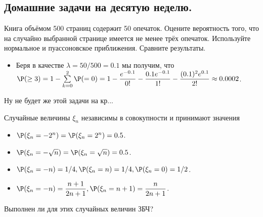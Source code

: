 \subsection{Домашние задачи на десятую неделю.}
\begin{problem}
    Книга объёмом 500 страниц содержит 50 опечаток.
    Оцените вероятность того, что на случайно выбранной странице имеется не менее трёх опечаток.
    Используйте нормальное и пуассоновское приближения.
    Сравните результаты.
\end{problem}
\begin{solution} \leavevmode
    \begin{itemize}
        \item Беря в качестве $\lambda = 50/500 = 0.1$ мы получим, что $\P(\geq 3) = 1 - \sum\limits_{k = 0}^{2} \P( = 0) = 1 - \dfrac{e^{-0.1}}{0!} - \dfrac{0.1e^{-0.1}}{1!} - \dfrac{(0.1)^2 e^{0.1}}{2!} \approx 0.0002$.
    \end{itemize}
    Ну не будет же этой задачи на кр...
\end{solution}
\begin{problem}
    Случайные величины $\xi_n$ независимы в совокупности и принимают значения
    \begin{itemize}
        \item $\P(\xi_n = -2^n) = \P(\xi_n = 2^n) = 0.5$.
        \item $\P(\xi_n = -\sqrt {n}) = \P(\xi_n = \sqrt {n}) = 0.5$.
        \item $\P(\xi_n = -n) = 1/4, \P(\xi_n = n) = 1/4, \P(\xi_n = 0) = 1/2$.
        \item $\P(\xi_n = -n) = \dfrac{n + 1}{2n + 1}, \P(\xi_n = n + 1) = \dfrac{n}{2n + 1}$.
    \end{itemize}
    Выполнен ли для этих случайных величин ЗБЧ?
\end{problem}
